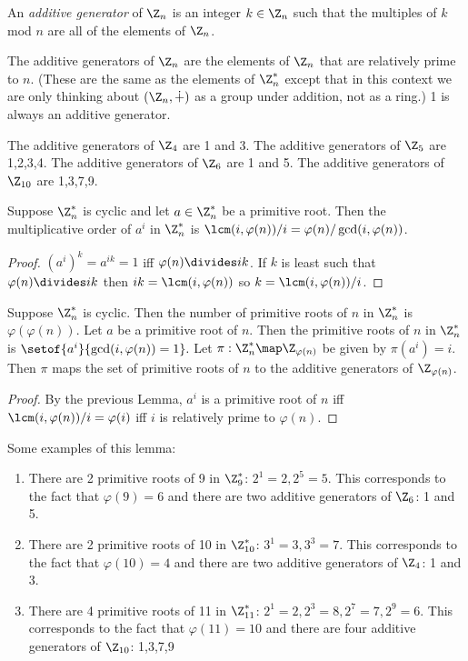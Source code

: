 \documentclass[oneside,12pt]{amsart}
\begin{document}
\begin{definition}
An \emph{additive generator} of $\Z_n$ is an integer $k\in\Z_n$ such that the multiples of $k$ mod $n$ are all of the elements of $\Z_n$.
\end{definition}

The additive generators of $\Z_n$ are the elements of $\Z_n$ that are relatively prime to $n$. (These are the same as the elements of $\Z^*_n$ except that
in this context we are only thinking about $\left(\Z_n,\dotplus\right)$ as a group under addition, not as a ring.)
1 is always an additive generator.

\begin{in_class_example}
The additive generators of $\Z_4$ are 1 and 3. The additive generators of $\Z_5$ are 1,2,3,4. The additive generators of $\Z_6$ are 1 and 5.
The additive generators of $\Z_{10}$ are 1,3,7,9.
\end{in_class_example}


\begin{lemma}
Suppose $\Z^*_n$ is cyclic and let $a\in\Z^*_n$ be a primitive root. 
Then the multiplicative order of $a^i$ in $\Z^*_n$ is $\lcm(i,\varphi(n))/i = \varphi(n)/\gcd(i,\varphi(n))$.
\end{lemma}
\begin{proof}
$(a^i)^k=a^{ik}=1$ iff $\varphi(n)\divides ik$. If $k$ is least such that $\varphi(n)\divides ik$ then $ik=\lcm(i, \varphi(n))$ so $k=\lcm(i,\varphi(n))/i$.
\end{proof}

\begin{corollary}
Suppose $\Z^*_n$ is cyclic. Then the number of primitive roots of $n$ in $\Z^*_n$ is $\varphi(\varphi(n))$.
Let $a$ be a primitive root of $n$. Then the primitive roots of $n$ in $\Z^*_n$ is $\setof{a^i}{\gcd(i,\varphi(n)) = 1}.$
Let $\pi:\Z^*_n\map\Z_{\varphi(n)}$ be given by $\pi(a^i) = i$. Then $\pi$ maps the set of primitive roots of $n$ to the additive generators of $\Z_{\varphi(n)}$.
\end{corollary}
\begin{proof}
By the previous Lemma, $a^i$ is a primitive root of $n$ iff $\lcm(i,\varphi(n))/i = \varphi(i)$ iff $i$ is relatively prime to $\varphi(n)$.
\end{proof}


\begin{in_class_example} Some examples of this lemma:
\begin{enumerate}
\item There are 2 primitive roots of 9 in $\Z^*_9$: $2^1=2, 2^5=5$. This corresponds to the fact that $\varphi(9)=6$ and there are two additive generators of $\Z_6$: 1 and 5.
\item There are 2 primitive roots of 10 in $\Z^*_{10}$: $3^1=3, 3^3=7$. This corresponds to the fact that $\varphi(10)=4$ and there are two additive generators of $\Z_4$: 1 and 3.
\item There are 4 primitive roots of 11 in $\Z^*_{11}$: $2^1=2, 2^3=8, 2^7=7, 2^9=6$. This corresponds to the fact that $\varphi(11)=10$ and there are four additive generators of $\Z_{10}$: 1,3,7,9
\end{enumerate}
\end{in_class_example}
\end{document}
